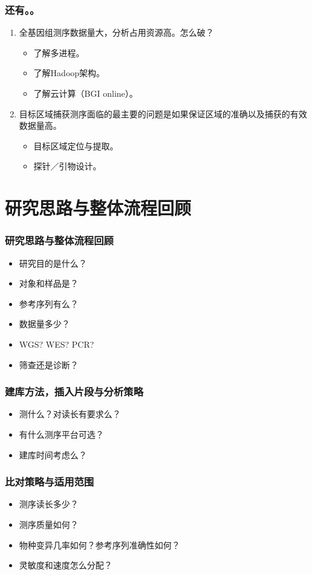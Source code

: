 \documentclass[12pt]{beamer}
\begin{document}
\begin{frame}\frametitle{还有。。}
  \begin{enumerate}
  \item 全基因组测序数据量大，分析占用资源高。怎么破？
    \begin{itemize}
      \item 了解多进程。
      \item 了解Hadoop架构。
      \item 了解云计算（BGI online）。
    \end{itemize}
  \item 目标区域捕获测序面临的最主要的问题是如果保证区域的准确以及捕获的有效数据量高。
    \begin{itemize}
    \item 目标区域定位与提取。
    \item 探针／引物设计。
    \end{itemize}
  \end{enumerate}
\end{frame}

\section{研究思路与整体流程回顾}
\begin{frame}\frametitle{研究思路与整体流程回顾}
  \begin{itemize}
  \item 研究目的是什么？
  \item 对象和样品是？
  \item 参考序列有么？
  \item 数据量多少？
  \item WGS? WES? PCR?
  \item 筛查还是诊断？
  \end{itemize}
\end{frame}

\begin{frame}\frametitle{建库方法，插入片段与分析策略}
  \begin{itemize}
  \item 测什么？对读长有要求么？
  \item 有什么测序平台可选？
  \item 建库时间考虑么？
  \end{itemize}
  
\end{frame}

\begin{frame}\frametitle{比对策略与适用范围}
  \begin{itemize}
  \item 测序读长多少？
  \item 测序质量如何？
  \item 物种变异几率如何？参考序列准确性如何？
  \item 灵敏度和速度怎么分配？
    \end{itemize}
\end{frame}
\end{document}
